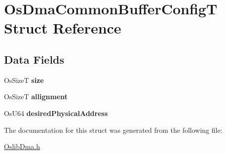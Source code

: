 \hypertarget{struct_os_dma_common_buffer_config_t}{
\section{\-Os\-Dma\-Common\-Buffer\-Config\-T \-Struct \-Reference}
\label{struct_os_dma_common_buffer_config_t}
}
\subsection*{\-Data \-Fields}
\begin{DoxyCompactItemize}
\item 
\hypertarget{struct_os_dma_common_buffer_config_t_acd4dd33ca17c11c7d7b80d1a3d7d748c}{
\-Os\-Size\-T {\bfseries size}}
\label{struct_os_dma_common_buffer_config_t_acd4dd33ca17c11c7d7b80d1a3d7d748c}

\item 
\hypertarget{struct_os_dma_common_buffer_config_t_a9972fbe530279f040d9e2ff7b87ce553}{
\-Os\-Size\-T {\bfseries allignment}}
\label{struct_os_dma_common_buffer_config_t_a9972fbe530279f040d9e2ff7b87ce553}

\item 
\hypertarget{struct_os_dma_common_buffer_config_t_aabf36eaad89e55790a6f5cafe4447d94}{
\-Os\-U64 {\bfseries desired\-Physical\-Address}}
\label{struct_os_dma_common_buffer_config_t_aabf36eaad89e55790a6f5cafe4447d94}

\end{DoxyCompactItemize}


\-The documentation for this struct was generated from the following file\-:\begin{DoxyCompactItemize}
\item 
\hyperlink{_oslib_dma_8h}{\-Oslib\-Dma.\-h}\end{DoxyCompactItemize}
